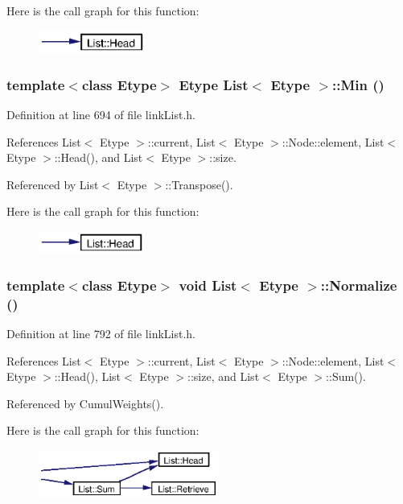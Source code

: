 Here is the call graph for this function:\begin{figure}[H]
\begin{center}
\leavevmode
\includegraphics[width=100pt]{classList_a23_cgraph}
\end{center}
\end{figure}
\subsubsection{\setlength{\rightskip}{0pt plus 5cm}template$<$class Etype$>$ Etype {\bf List}$<$ Etype $>$::Min ()}\label{classList_a22}




Definition at line 694 of file link\-List.h.

References List$<$ Etype $>$::current, List$<$ Etype $>$::Node::element, List$<$ Etype $>$::Head(), and List$<$ Etype $>$::size.

Referenced by List$<$ Etype $>$::Transpose().

Here is the call graph for this function:\begin{figure}[H]
\begin{center}
\leavevmode
\includegraphics[width=99pt]{classList_a22_cgraph}
\end{center}
\end{figure}
\subsubsection{\setlength{\rightskip}{0pt plus 5cm}template$<$class Etype$>$ void {\bf List}$<$ Etype $>$::Normalize ()}\label{classList_a25}




Definition at line 792 of file link\-List.h.

References List$<$ Etype $>$::current, List$<$ Etype $>$::Node::element, List$<$ Etype $>$::Head(), List$<$ Etype $>$::size, and List$<$ Etype $>$::Sum().

Referenced by Cumul\-Weights().

Here is the call graph for this function:\begin{figure}[H]
\begin{center}
\leavevmode
\includegraphics[width=167pt]{classList_a25_cgraph}
\end{center}
\end{figure}
